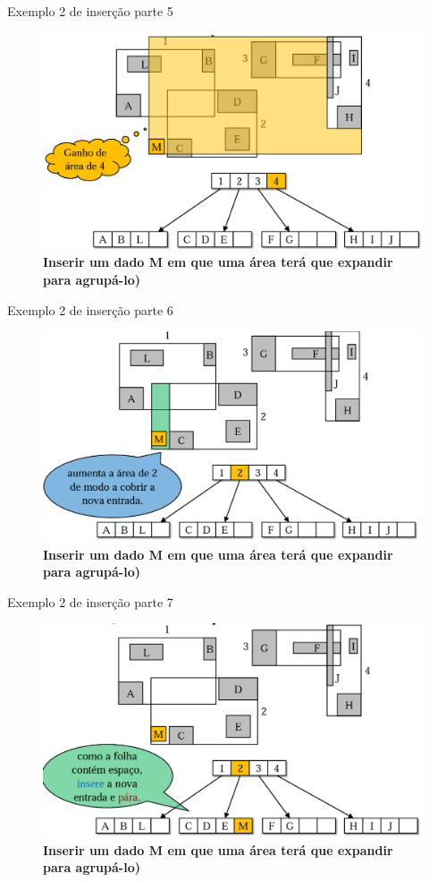\documentclass[compress,aspectratio=169]{beamer}
\begin{document}
\begin{frame}{Exemplo 2 de inserção parte 5}
\begin{figure}[] 
        \centering
        \includegraphics[width=0.65\linewidth]{insercao7.png}
        \caption{\textbf{Inserir um dado M em que uma área terá que expandir para agrupá-lo)}}
        \label{fig:enter-label}  
\end{figure}
\end{frame}

\begin{frame}{Exemplo 2 de inserção parte 6}
\begin{figure}[] 
        \centering
        \includegraphics[width=0.65\linewidth]{insercao8.png}
        \caption{\textbf{Inserir um dado M em que uma área terá que expandir para agrupá-lo)}}
        \label{fig:enter-label}  
\end{figure}
\end{frame}

\begin{frame}{Exemplo 2 de inserção parte 7}
\begin{figure}[] 
        \centering
        \includegraphics[width=0.65\linewidth]{insercao9.png}
        \caption{\textbf{Inserir um dado M em que uma área terá que expandir para agrupá-lo)}}
        \label{fig:enter-label}  
\end{figure}
\end{frame}
\end{document}

